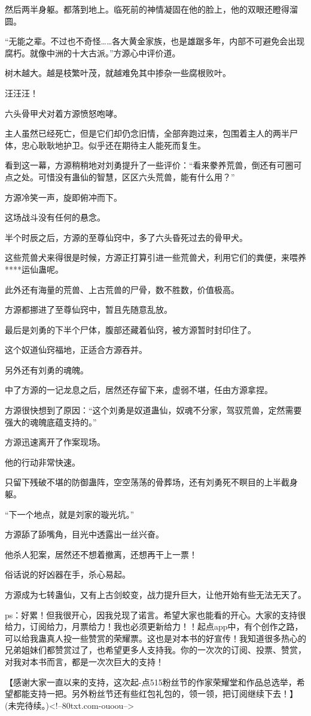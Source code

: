 \begin{this_body}
然后两半身躯。都落到地上。临死前的神情凝固在他的脸上，他的双眼还瞪得溜圆。

“无能之辈。不过也不奇怪……各大黄金家族，也是雄踞多年，内部不可避免会出现腐朽。就像中洲的十大古派。”方源心中评价道。

树木越大。越是枝繁叶茂，就越难免其中掺杂一些腐根败叶。

汪汪汪！

六头骨甲犬对着方源愤怒咆哮。

主人虽然已经死亡，但是它们却仍念旧情，全部奔跑过来，包围着主人的两半尸体，忠心耿耿地护卫。似乎还在期待主人能死而复生。

看到这一幕，方源稍稍地对刘勇提升了一些评价：“看来豢养荒兽，倒还有可圈可点之处。可惜没有蛊仙的智慧，区区六头荒兽，能有什么用？”

方源冷笑一声，旋即俯冲而下。

这场战斗没有任何的悬念。

半个时辰之后，方源的至尊仙窍中，多了六头昏死过去的骨甲犬。

这些荒兽犬来得很是时候，方源正打算引进一些荒兽犬，利用它们的粪便，来喂养****运仙蛊呢。

此外还有海量的荒兽、上古荒兽的尸骨，数不胜数，价值极高。

方源都挪进了至尊仙窍中，暂且先随意乱放。

最后是刘勇的下半个尸体，腹部还藏着仙窍，被方源暂时封印住了。

这个奴道仙窍福地，正适合方源吞并。

另外还有刘勇的魂魄。

中了方源的一记龙息之后，居然还存留下来，虚弱不堪，任由方源拿捏。

方源很快想到了原因：“这个刘勇是奴道蛊仙，奴魂不分家，驾驭荒兽，定然需要强大的魂魄底蕴支持的。”

方源迅速离开了作案现场。

他的行动非常快速。

只留下残破不堪的防御蛊阵，空空荡荡的骨葬场，还有刘勇死不瞑目的上半截身躯。

“下一个地点，就是刘家的璇光坑。”

方源舔了舔嘴角，目光中透露出一丝兴奋。

他杀人犯案，居然还不想着撤离，还想再干上一票！

俗话说的好凶器在手，杀心易起。

方源成为七转蛊仙，又有上古剑蛟变，战力提升巨大，让他开始有些无法无天了。

ps：好累！但我很开心，因我兑现了诺言。希望大家也能看的开心。大家的支持很给力，订阅给力，月票给力！我也必须更新给力！！起点app中，有个创作之路，可以给我蛊真人投一些赞赏的荣耀票。这也是对本书的好宣传！我知道很多热心的兄弟姐妹们都赞赏过了，也希望更多人支持我。你的一次次的订阅、投票、赞赏，对我对本书而言，都是一次次巨大的支持！

【感谢大家一直以来的支持，这次起-点515粉丝节的作家荣耀堂和作品总选举，希望都能支持一把。另外粉丝节还有些红包礼包的，领一领，把订阅继续下去！】(未完待续。)<!--80txt.com-ouoou-->

\end{this_body}

